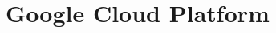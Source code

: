 \documentclass[a4paper, notitlepage]{report}
\begin{document}
%
%
%
%
%
%
%
%
%
%
%
%
%
%
%
%
%
%
%
\chapter{Google Cloud Platform}

%
%
%
\end{document}
